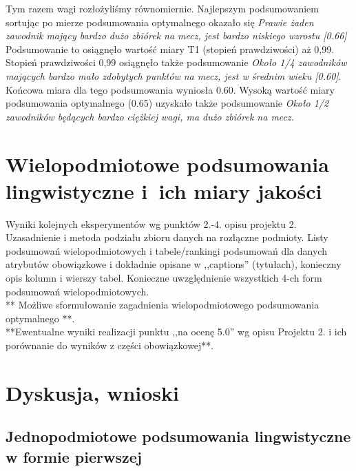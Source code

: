 \documentclass{classrep}
\begin{document}
Tym razem wagi rozłożyliśmy równomiernie. Najlepszym podsumowaniem sortując po mierze podsumowania optymalnego okazało się \textit{Prawie żaden zawodnik mający bardzo dużo zbiórek na mecz, jest bardzo niskiego wzrostu [0.66]} Podsumowanie to osiągnęło wartość miary T1 (stopień prawdziwości) aż 0,99. Stopień prawdziwości 0,99 osiągnęło także podsumowanie \textit{Około 1/4 zawodników mających bardzo mało zdobytych punktów na mecz, jest w średnim wieku [0.60]}. Końcowa miara dla tego podsumowania wyniosła 0.60. Wysoką wartość miary podsumowania optymalnego (0.65) uzyskało także podsumowanie \textit{Około 1/2 zawodników będących bardzo ciężkiej wagi, ma dużo zbiórek na mecz.}



\section{Wielopodmiotowe podsumowania lingwistyczne i~ich miary jakości} 
Wyniki kolejnych eksperymentów wg punktów 2.-4. opisu projektu 2. Uzasadnienie i
metoda podziału zbioru danych na rozłączne podmioty. Listy podsumowań
wielopodmiotowych i tabele/rankingi podsumowań dla danych atrybutów obowiązkowe i
dokładnie opisane w ,,captions'' (tytułach), konieczny opis kolumn i wierszy tabel.
Konieczne uwzględnienie wszystkich 4-ch form podsumowań wielopodmiotowych. 
\\ 

** Możliwe sformułowanie zagadnienia wielopodmiotowego podsumowania optymalnego **.\\

{**Ewentualne wyniki realizacji punktu ,,na ocenę 5.0'' wg opisu Projektu 2. i ich porównanie do wyników z
części obowiązkowej**.}\\



\section{Dyskusja, wnioski}
\subsection{Jednopodmiotowe podsumowania lingwistyczne w formie pierwszej}
\end{document}
